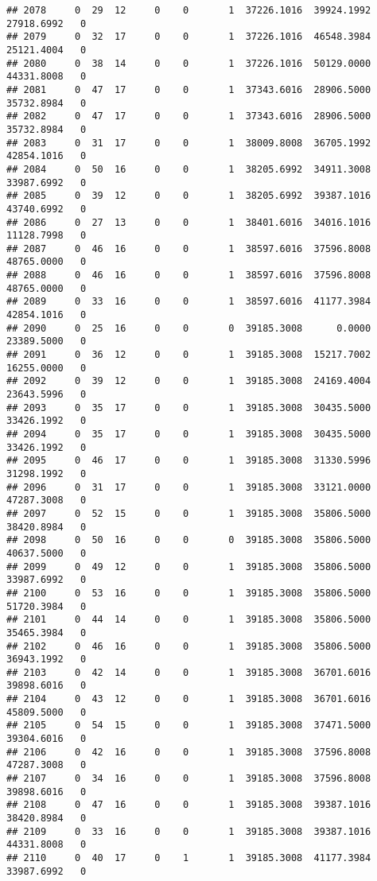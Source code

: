\documentclass[
]{article}
\begin{document}
\begin{enumerate}
\begin{verbatim}
## 2078     0  29  12     0    0       1  37226.1016  39924.1992  27918.6992   0
## 2079     0  32  17     0    0       1  37226.1016  46548.3984  25121.4004   0
## 2080     0  38  14     0    0       1  37226.1016  50129.0000  44331.8008   0
## 2081     0  47  17     0    0       1  37343.6016  28906.5000  35732.8984   0
## 2082     0  47  17     0    0       1  37343.6016  28906.5000  35732.8984   0
## 2083     0  31  17     0    0       1  38009.8008  36705.1992  42854.1016   0
## 2084     0  50  16     0    0       1  38205.6992  34911.3008  33987.6992   0
## 2085     0  39  12     0    0       1  38205.6992  39387.1016  43740.6992   0
## 2086     0  27  13     0    0       1  38401.6016  34016.1016  11128.7998   0
## 2087     0  46  16     0    0       1  38597.6016  37596.8008  48765.0000   0
## 2088     0  46  16     0    0       1  38597.6016  37596.8008  48765.0000   0
## 2089     0  33  16     0    0       1  38597.6016  41177.3984  42854.1016   0
## 2090     0  25  16     0    0       0  39185.3008      0.0000  23389.5000   0
## 2091     0  36  12     0    0       1  39185.3008  15217.7002  16255.0000   0
## 2092     0  39  12     0    0       1  39185.3008  24169.4004  23643.5996   0
## 2093     0  35  17     0    0       1  39185.3008  30435.5000  33426.1992   0
## 2094     0  35  17     0    0       1  39185.3008  30435.5000  33426.1992   0
## 2095     0  46  17     0    0       1  39185.3008  31330.5996  31298.1992   0
## 2096     0  31  17     0    0       1  39185.3008  33121.0000  47287.3008   0
## 2097     0  52  15     0    0       1  39185.3008  35806.5000  38420.8984   0
## 2098     0  50  16     0    0       0  39185.3008  35806.5000  40637.5000   0
## 2099     0  49  12     0    0       1  39185.3008  35806.5000  33987.6992   0
## 2100     0  53  16     0    0       1  39185.3008  35806.5000  51720.3984   0
## 2101     0  44  14     0    0       1  39185.3008  35806.5000  35465.3984   0
## 2102     0  46  16     0    0       1  39185.3008  35806.5000  36943.1992   0
## 2103     0  42  14     0    0       1  39185.3008  36701.6016  39898.6016   0
## 2104     0  43  12     0    0       1  39185.3008  36701.6016  45809.5000   0
## 2105     0  54  15     0    0       1  39185.3008  37471.5000  39304.6016   0
## 2106     0  42  16     0    0       1  39185.3008  37596.8008  47287.3008   0
## 2107     0  34  16     0    0       1  39185.3008  37596.8008  39898.6016   0
## 2108     0  47  16     0    0       1  39185.3008  39387.1016  38420.8984   0
## 2109     0  33  16     0    0       1  39185.3008  39387.1016  44331.8008   0
## 2110     0  40  17     0    1       1  39185.3008  41177.3984  33987.6992   0

\end{verbatim}
\end{enumerate}
\end{document}
